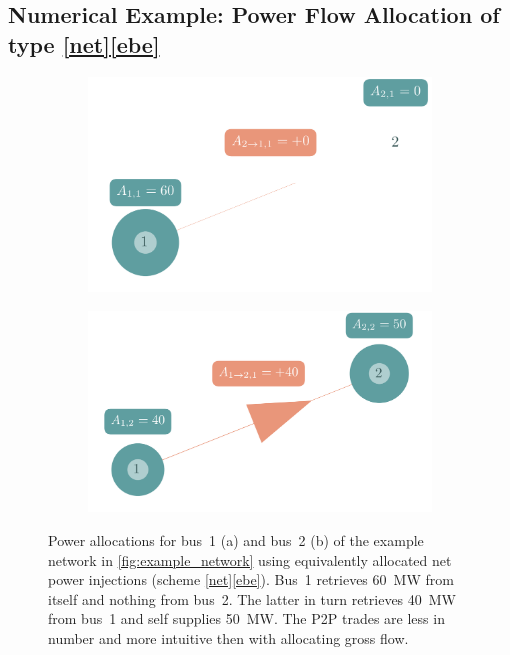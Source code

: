 \documentclass[11pt,twocolumn]{article}
\begin{document}
\subsection{Numerical Example: Power Flow Allocation of type \ref{net}\ref{ebe}}
\label{sec:example_plots}
\begin{figure}[h!]
    \begin{subfigure}[c]{\linewidth}
    \includegraphics[width=\linewidth]{example_allocation_bus1_net_ebe.png}
    \vspace{-40pt}
    \subcaption{}
    \label{fig:example_allocation_bus1_net_ebe}
    \end{subfigure}
    \begin{subfigure}[c]{\linewidth}
    \includegraphics[width=\linewidth]{example_allocation_bus2_net_ebe.png}
    \vspace{-40pt}
    \subcaption{}
    \label{fig:example_allocation_bus2_net_ebe}
    \end{subfigure}
    \caption{Power allocations for bus~1 (a) and bus~2 (b) of the example network in \cref{fig:example_network} using equivalently allocated net power injections (scheme \ref{net}\ref{ebe}). Bus~1 retrieves 60~MW from itself and nothing from bus~2. The latter in turn retrieves 40~MW from bus~1 and self supplies 50~MW. The P2P trades are less in number and more intuitive then with allocating gross flow.}
    \label{fig:example_allocation_net_ebe}
\end{figure}
\end{document}
